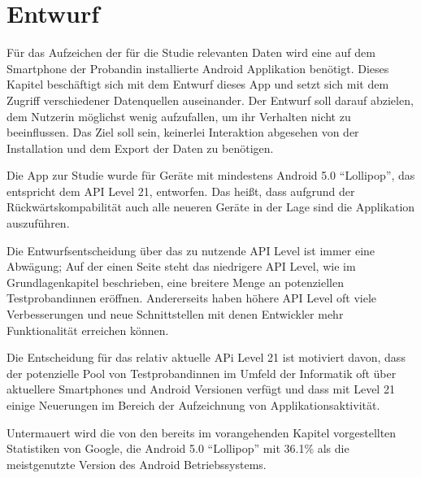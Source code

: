 
\chapter{Entwurf}
\label{ch:Entwurf}

Für das Aufzeichen der für die Studie relevanten Daten wird eine auf dem Smartphone der Probandin installierte Android Applikation benötigt. 
Dieses Kapitel beschäftigt sich mit dem Entwurf dieses App und setzt sich mit dem Zugriff verschiedener Datenquellen auseinander.
Der Entwurf soll darauf abzielen, dem Nutzerin möglichst wenig aufzufallen, um ihr Verhalten nicht zu beeinflussen.
Das Ziel soll sein, keinerlei Interaktion abgesehen von der Installation und dem Export der Daten zu benötigen. 
\par

Die App zur Studie wurde für Geräte mit mindestens Android 5.0 "`Lollipop"', das entspricht dem API Level 21, entworfen.
Das heißt, dass aufgrund der Rückwärtskompabilität auch alle neueren Geräte in der Lage sind die Applikation auszuführen.
\par


Die Entwurfsentscheidung über das zu nutzende API Level ist immer eine Abwägung;
Auf der einen Seite steht das niedrigere API Level, wie im Grundlagenkapitel beschrieben, 
eine breitere Menge an potenziellen Testprobandinnen eröffnen.
Andererseits haben höhere API Level oft viele Verbesserungen und neue Schnittstellen mit denen Entwickler mehr Funktionalität erreichen können.
\par
Die Entscheidung für das relativ aktuelle APi Level 21 ist motiviert davon, 
dass der potenzielle Pool von Testprobandinnen im Umfeld der Informatik oft über aktuellere Smartphones und Android Versionen verfügt
und dass mit Level 21 einige Neuerungen im Bereich der Aufzeichnung von Applikationsaktivität.

Untermauert wird die von den bereits im vorangehenden Kapitel vorgestellten Statistiken von Google\cite{androiddistr}, 
die Android 5.0 "`Lollipop"' mit 36.1\% als die meistgenutzte Version des Android Betriebssystems.

